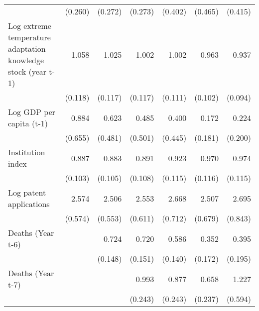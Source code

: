 \begin{table}[htbp]
\begin{tabular}{l*{6}{D{.}{.}{-1}}}
                    &     (0.260)         &     (0.272)         &     (0.273)         &     (0.402)         &     (0.465)         &     (0.415)         \\
\addlinespace
Log extreme temperature adaptation knowledge stock (year t-1)&       1.058         &       1.025         &       1.002         &       1.002         &       0.963         &       0.937         \\
                    &     (0.118)         &     (0.117)         &     (0.117)         &     (0.111)         &     (0.102)         &     (0.094)         \\
\addlinespace
Log GDP per capita (t-1)&       0.884         &       0.623         &       0.485         &       0.400         &       0.172\sym{*}  &       0.224\sym{*}  \\
                    &     (0.655)         &     (0.481)         &     (0.501)         &     (0.445)         &     (0.181)         &     (0.200)         \\
\addlinespace
Institution index   &       0.887         &       0.883         &       0.891         &       0.923         &       0.970         &       0.974         \\
                    &     (0.103)         &     (0.105)         &     (0.108)         &     (0.115)         &     (0.116)         &     (0.115)         \\
\addlinespace
Log patent applications&       2.574\sym{***}&       2.506\sym{***}&       2.553\sym{***}&       2.668\sym{***}&       2.507\sym{***}&       2.695\sym{***}\\
                    &     (0.574)         &     (0.553)         &     (0.611)         &     (0.712)         &     (0.679)         &     (0.843)         \\
\addlinespace
Deaths (Year t-6)   &                     &       0.724\sym{\%}  &       0.720\sym{\%}  &       0.586\sym{**} &       0.352\sym{**} &       0.395\sym{*}  \\
                    &                     &     (0.148)         &     (0.151)         &     (0.140)         &     (0.172)         &     (0.195)         \\
\addlinespace
Deaths (Year t-7)   &                     &                     &       0.993         &       0.877         &       0.658         &       1.227         \\
                    &                     &                     &     (0.243)         &     (0.243)         &     (0.237)         &     (0.594)         \\

\end{tabular}
\end{table}
